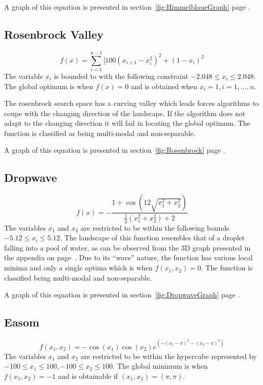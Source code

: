 A graph of this equation is presented in section~\ref{fig:HimmelblaueGraph} page \pageref{fig:HimmelblaueGraph}.
\subsection{Rosenbrock Valley}
\begin{equation}
	f(x) = \sum_{i=1}^{n-1}[100(x_{i+1} - x_i^2)^2 + (1-x_i)^2
\end{equation}
The variable $x_i$ is bounded to with the following constraint $ -2.048 \leq x_i \leq 2.048 $\cite{numericalABC,ABCCompareStudy,ARPSO,PerfABC,TSGlobalOptContinFunc,HybridIntelliGA}. The global optimum is when $f(x) = 0$ and is obtained when $x_i = 1, i = 1,\ldots,n$\cite{numericalABC,ABCCompareStudy,ARPSO,TSGlobalOptContinFunc,HybridIntelliGA}.

The rosenbrock search space has a curving valley which leads forces algorithms to coupe with the changing direction of the landscape\cite{numericalABC,ABCCompareStudy,ChaoticABC,PerfABC,HybridIntelliGA}. If the algorithm does not adapt to the changing direction it will fail in locating the global optimum. The function is classified as being multi-modal and non-separable\cite{numericalABC,ABCCompareStudy,ChaoticABC,PerfABC,HybridIntelliGA}.

A graph of this equation is presented in section~\ref{fig:Rosenbrock} page \pageref{fig:Rosenbrock}.
\subsection{Dropwave}
\begin{equation}
	f(x) = -\frac{1 + \cos{(12\sqrt{x_1^2 + x_2^2})}}{\frac{1}{2}(x_1^2 + x_2^2) + 2}
\end{equation}
The variables $x_1$ and $x_2$ are restricted to be within the following bounds $-5.12 \leq x_i \leq 5.12$\cite{TestFunctions}. The landscape of this function resembles that of a droplet falling into a pool of water, as can be observed from the 3D graph presented in the appendix on page~\pageref{fig:DropwaveGraph}. Due to its ``wave'' nature, the function has various local minima and only a single optima which is when $f(x_1,x_2) = 0$. The function is classified being multi-modal and non-separable\cite{TestFunctions}.

A graph of this equation is presented in section~\ref{fig:DropwaveGraph} page \pageref{fig:DropwaveGraph}.
\subsection{Easom}
\begin{equation}
	f(x_1,x_2) = -\cos(x_1)\cos(x_2)e^{(-(x_1 - \pi)^2 - (x_2 - \pi)^2)}
\end{equation}
The variables $x_1$ and $x_2$ are restricted to be within the hypercube represented by $-100 \leq x_1 \leq 100, -100 \leq x_2 \leq 100$\cite{TSGlobalOptContinFunc,ContinACSTS,TestFunctions}. The global minimum is when $f(x_1,x_2) = -1$ and is obtainable if $(x_1,x_2) = (\pi,\pi)$\cite{TSGlobalOptContinFunc,ContinACSTS,TestFunctions}. 

